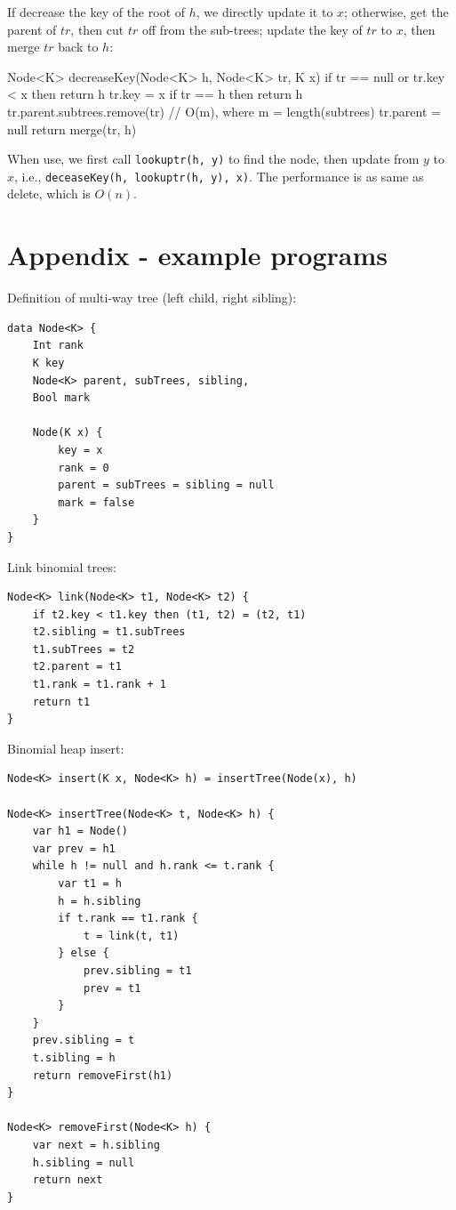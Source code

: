 \documentclass[b5paper]{article}
\begin{document}
\begin{Answer}[ref = {ex:pairing-heap-del}]
{If decrease the key of the root of $h$, we directly update it to $x$; otherwise, get the parent of $tr$, then cut $tr$ off from the sub-trees; update the key of $tr$ to $x$, then merge $tr$ back to $h$:

\begin{Bourbaki}
Node<K> decreaseKey(Node<K> h, Node<K> tr, K x) {
    if tr == null or tr.key < x then return h
    tr.key = x
    if tr == h then return h
    tr.parent.subtrees.remove(tr)  // O(m), where m = length(subtrees)
    tr.parent = null
    return merge(tr, h)
}
\end{Bourbaki}

When use, we first call \lstinline{lookuptr(h, y)} to find the node, then update from $y$ to $x$, i.e., \lstinline{deceaseKey(h, lookuptr(h, y), x)}. The performance is as same as delete, which is $O(n)$.
}
\end{Answer}

\section{Appendix - example programs}

Definition of multi-way tree (left child, right sibling):

\begin{lstlisting}[language = Bourbaki]
data Node<K> {
    Int rank
    K key
    Node<K> parent, subTrees, sibling,
    Bool mark

    Node(K x) {
        key = x
        rank = 0
        parent = subTrees = sibling = null
        mark = false
    }
}
\end{lstlisting}

Link binomial trees:

\begin{lstlisting}[language = Bourbaki]
Node<K> link(Node<K> t1, Node<K> t2) {
    if t2.key < t1.key then (t1, t2) = (t2, t1)
    t2.sibling = t1.subTrees
    t1.subTrees = t2
    t2.parent = t1
    t1.rank = t1.rank + 1
    return t1
}
\end{lstlisting}

Binomial heap insert:

\begin{lstlisting}[language = Bourbaki]
Node<K> insert(K x, Node<K> h) = insertTree(Node(x), h)

Node<K> insertTree(Node<K> t, Node<K> h) {
    var h1 = Node()
    var prev = h1
    while h != null and h.rank <= t.rank {
        var t1 = h
        h = h.sibling
        if t.rank == t1.rank {
            t = link(t, t1)
        } else {
            prev.sibling = t1
            prev = t1
        }
    }
    prev.sibling = t
    t.sibling = h
    return removeFirst(h1)
}

Node<K> removeFirst(Node<K> h) {
    var next = h.sibling
    h.sibling = null
    return next
}
\end{lstlisting}
\end{document}
